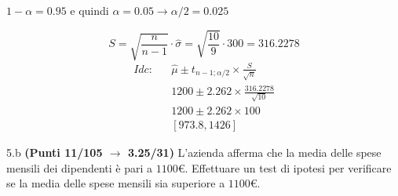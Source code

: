 \documentclass[
  11pt,
]{book}
\theoremstyle{mytheoremstyle}
\theoremstyle{mydefstyle}
\newenvironment{sol}
  {
  \begin{tcolorbox}[enhanced,breakable,arc=0.1mm,boxrule=1pt,colback=white,colframe=iblue,
  title=\bf \fontfamily{lmss}\selectfont \hspace{.5 cm} Soluzione,drop fuzzy shadow]

}{
\end{tcolorbox}
  }
\begin{document}
\begin{sol}
\(1-\alpha =0.95\) e quindi \(\alpha=0.05\rightarrow \alpha/2=0.025\)

\[
      S  =\sqrt{\frac {n}{n-1}}\cdot\hat\sigma =
     \sqrt{\frac { 10 }{ 9 }}\cdot 300 = 316.2278 
\]
\begin{eqnarray*}
  Idc: & &  \hat\mu \pm  t_{n-1;\alpha/2} \times \frac{S}{\sqrt{n}} \\
     & &  1200 \pm  2.262 \times \frac{ 316.2278 }{\sqrt{ 10 }} \\
     & &  1200 \pm  2.262 \times  100 \\
     & & [ 973.8 ,  1426 ]
\end{eqnarray*}

\end{sol}

5.b \textbf{(Punti 11/105 \(\rightarrow\) 3.25/31)} L'azienda afferma che la media delle spese mensili dei dipendenti è pari a \(1100€\). Effettuare un test di ipotesi per verificare se la media delle spese mensili sia superiore a \(1100€\).
\end{document}
